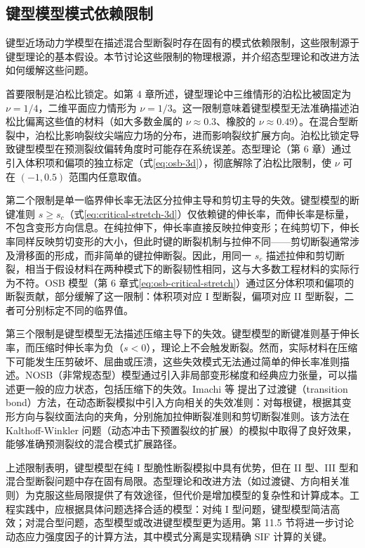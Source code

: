 \subsection{键型模型模式依赖限制}\label{sec:ch11-mode-limitations}

键型近场动力学模型在描述混合型断裂时存在固有的模式依赖限制，这些限制源于键型理论的基本假设。本节讨论这些限制的物理根源，并介绍态型理论和改进方法如何缓解这些问题。

首要限制是泊松比锁定。如第 4 章所述，键型理论中三维情形的泊松比被固定为 $\nu=1/4$，二维平面应力情形为 $\nu=1/3$。这一限制意味着键型模型无法准确描述泊松比偏离这些值的材料（如大多数金属的 $\nu\approx 0.3$、橡胶的 $\nu\approx 0.49$）。在混合型断裂中，泊松比影响裂纹尖端应力场的分布，进而影响裂纹扩展方向。泊松比锁定导致键型模型在预测裂纹偏转角度时可能存在系统误差。态型理论（第 6 章）通过引入体积项和偏项的独立标定（式\eqref{eq:osb-3d}），彻底解除了泊松比限制，使 $\nu$ 可在 $(-1, 0.5)$ 范围内任意取值。

第二个限制是单一临界伸长率无法区分拉伸主导和剪切主导的失效。键型模型的断键准则 $s\geq s_c$（式\eqref{eq:critical-stretch-3d}）仅依赖键的伸长率，而伸长率是标量，不包含变形方向信息。在纯拉伸下，伸长率直接反映拉伸变形；在纯剪切下，伸长率同样反映剪切变形的大小，但此时键的断裂机制与拉伸不同——剪切断裂通常涉及滑移面的形成，而非简单的键拉伸断裂。因此，用同一 $s_c$ 描述拉伸和剪切断裂，相当于假设材料在两种模式下的断裂韧性相同，这与大多数工程材料的实际行为不符。OSB 模型（第 6 章式\eqref{eq:osb-critical-stretch}）通过区分体积项和偏项的断裂贡献，部分缓解了这一限制：体积项对应 I 型断裂，偏项对应 II 型断裂，二者可分别标定不同的临界值。

第三个限制是键型模型无法描述压缩主导下的失效。键型模型的断键准则基于伸长率，而压缩时伸长率为负（$s<0$），理论上不会触发断裂。然而，实际材料在压缩下可能发生压剪破坏、屈曲或压溃，这些失效模式无法通过简单的伸长率准则描述。NOSB（非常规态型）模型通过引入非局部变形梯度和经典应力张量，可以描述更一般的应力状态，包括压缩下的失效。Imachi 等 \cite{Imachi2019} 提出了过渡键（transition bond）方法，在动态断裂模拟中引入方向相关的失效准则：对每根键，根据其变形方向与裂纹面法向的夹角，分别施加拉伸断裂准则和剪切断裂准则。该方法在 Kalthoff-Winkler 问题（动态冲击下预置裂纹的扩展）的模拟中取得了良好效果，能够准确预测裂纹的混合模式扩展路径。

上述限制表明，键型模型在纯 I 型脆性断裂模拟中具有优势，但在 II 型、III 型和混合型断裂问题中存在固有局限。态型理论和改进方法（如过渡键、方向相关准则）为克服这些局限提供了有效途径，但代价是增加模型的复杂性和计算成本。工程实践中，应根据具体问题选择合适的模型：对纯 I 型问题，键型模型简洁高效；对混合型问题，态型模型或改进键型模型更为适用。第 11.5 节将进一步讨论动态应力强度因子的计算方法，其中模式分离是实现精确 SIF 计算的关键。


